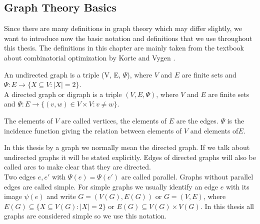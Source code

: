 \subsection{Graph Theory Basics}
Since there are many definitions in graph theory which may differ slightly, we want to introduce now the basic notation 
and definitions that we use throughout this thesis. The definitions in this chapter are mainly taken from the textbook 
about combinatorial optimization by Korte and Vygen \cite{KorteVygenCombOpt2007}.

\begin{definition}

An undirected graph is a triple (V, E, $\Psi$), where $V$ and $E$ are finite sets and
$\Psi: E\to \{X \subseteq V: |X| = 2\}$. \\
A directed graph or digraph is a triple $(V, E, \Psi)$,
where $V$ and $E$ are finite sets and $\Psi : E \to \{(v, w) \in V \times V : v \neq w\}$. 
\end{definition}
 
The elements of $V$ are called vertices, the elements of $E$ are the edges. $\Psi$ is the incidence 
function giving the relation between elements of $V$ and elements of$E$. 

In this thesis by a graph we normally mean the directed graph. If we talk about undirected graphs it will be stated 
explicitly. Edges of directed graphs will also be called arcs to make clear that they are directed.\\

Two edges $e, e'$ with $\Psi(e) = \Psi ( e')$ are called parallel. Graphs without parallel
edges are called simple. For simple graphs we usually identify an edge $e$ with its
image $\psi(e)$ and write $G = (V(G), E(G))$ or $G=(V,E)$, where $E(G) \subseteq \{X \subseteq V(G) : |X| = 2\}$
or $E(G) \subseteq V(G) \times V(G)$. %
In this thesis all graphs are considered simple so we use this notation. 
 
